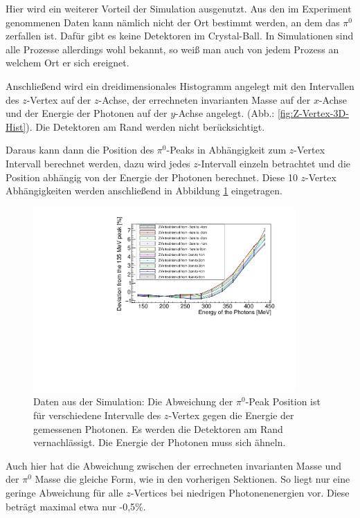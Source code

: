 \documentclass[a4paper,11pt,oneside,final,german,openbib,pdftex]{scrbook}
\begin{document}
{Hier wird ein weiterer Vorteil der Simulation ausgenutzt. Aus den im Experiment genommenen Daten kann n\"amlich nicht der Ort bestimmt werden, an dem das $\pi^0$ zerfallen ist. Daf\"ur gibt es keine Detektoren im Crystal-Ball. In Simulationen sind alle Prozesse allerdings wohl bekannt, so wei{\ss} man auch von jedem Prozess an welchem Ort er sich ereignet. 

Anschließend wird ein dreidimensionales Histogramm angelegt mit den Intervallen des $z$-Vertex auf der $z$-Achse, der errechneten invarianten Masse auf der $x$-Achse und der Energie der Photonen auf der $y$-Achse angelegt. (Abb.: \ref{fig:Z-Vertex-3D-Hist}). Die Detektoren am Rand werden nicht ber\"ucksichtigt.

Daraus kann dann die Position des $\pi^0$-Peaks in Abhängigkeit zum $z$-Vertex Intervall berechnet werden, dazu wird jedes $z$-Intervall einzeln betrachtet und die Position abhängig von der Energie der Photonen berechnet. 
Diese 10 $z$-Vertex Abhängigkeiten werden anschließend in Abbildung \ref{fig:Z-Vertex-Multi-Graph} eingetragen.

\begin{figure}[h!]
	\begin{center}
		\includegraphics[width=100mm]{20172804MCZVertexDeviation}
		\caption[Simulation: Abweichung f\"ur verschiedene $z$-Vertices]{Daten aus der Simulation: Die Abweichung der $\pi^0$-Peak Position ist für verschiedene Intervalle des $z$-Vertex gegen die Energie der gemessenen Photonen. Es werden die Detektoren am Rand vernachl\"assigt. Die Energie der Photonen muss sich \"ahneln.}
		\label{fig:Z-Vertex-Multi-Graph}
	\end{center}
\end{figure}

Auch hier hat die Abweichung zwischen der errechneten invarianten Masse und der $\pi^0$ Masse die gleiche Form, wie in den vorherigen Sektionen. So liegt nur eine geringe Abweichung f\"ur alle $z$-Vertices bei niedrigen Photonenenergien vor. Diese betr\"agt maximal etwa nur -0,5\%. 

}
\end{document}
